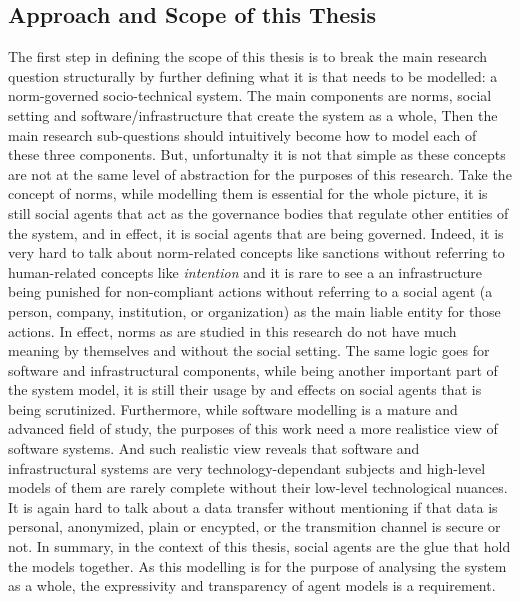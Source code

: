 \subsection{Approach and Scope of this Thesis}
The first step in defining the scope of this thesis is to break the main research question structurally by further defining what it is that needs to be modelled: a norm-governed socio-technical system. The main components are norms, social setting and software/infrastructure that create the system as a whole, 
Then the main research sub-questions should intuitively become how to model each of these three components. But, unfortunalty it is not that simple as these concepts are not at the same level of abstraction for the purposes of this research. 
Take the concept of norms, while modelling them is essential for the whole picture, it is still social agents that act as the governance bodies that regulate other entities of the system, and in effect, it is social agents that are being governed. Indeed, it is very hard to talk about norm-related concepts like sanctions without referring to human-related concepts like \textit{intention} and it is rare to see a an infrastructure being punished for non-compliant actions without referring to a social agent (a person, company, institution, or organization) as the main liable entity for those actions. In effect, norms as are studied in this research do not have much meaning by themselves and without the social setting. The same logic goes for software and infrastructural components, while being another important part of the system model, it is still their usage by and effects on social agents that is being scrutinized. Furthermore, while software modelling is a mature and advanced field of study, the purposes of this work need a more realistice view of software systems. And such realistic view reveals that software and infrastructural systems are very technology-dependant subjects and high-level models of them are rarely complete without their low-level technological nuances. It is again hard to talk about a data transfer without mentioning if that data is personal, anonymized, plain or encypted, or the transmition channel is secure or not. In summary, in the context of this thesis, social agents are the glue that hold the models together. As this modelling is for the purpose of analysing the system as a whole, the expressivity and transparency of agent models is a requirement.

